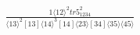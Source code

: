 \documentclass[varwidth, border=5pt]{standalone}
\begin{document}
\begin{my}
$\begin{gathered}
\scriptscriptstyle\frac{1⟨12⟩^2tr5_{1234}^2}{⟨13⟩^2[13]⟨14⟩^3[14]⟨23⟩[34]⟨35⟩⟨45⟩}
\end{gathered}$
\end{my}
\end{document}
